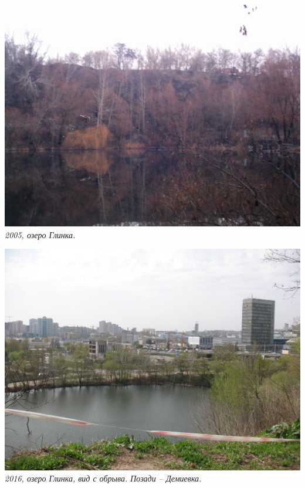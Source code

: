 \begin{center}
\includegraphics[width=\linewidth]{pix/glinka-imag0019.jpg}
\textit{2005, озеро Глинка.}
\end{center} 

\begin{center}
\includegraphics[width=\linewidth]{pix/s-glinka-IMG_4542.JPG}
\textit{2016, озеро Глинка, вид с обрыва. Позади – Демиевка.}
\end{center} 

\newpage

